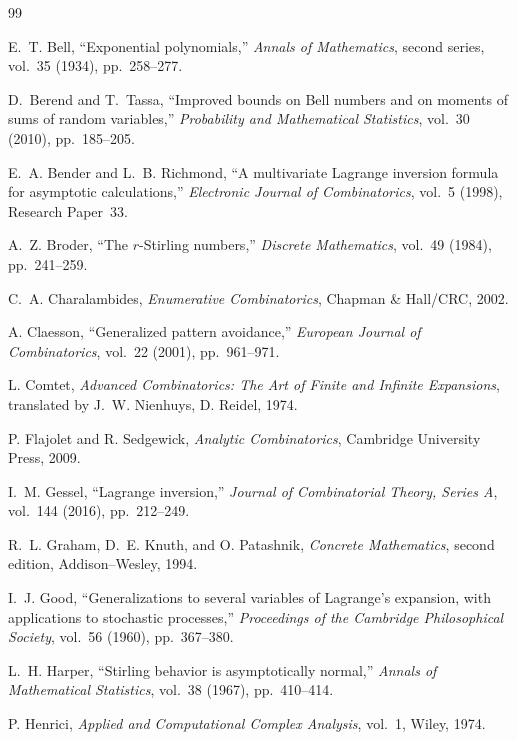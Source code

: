 \documentclass[11pt,a4paper,oneside,openany]{book}
\theoremstyle{definition}
\theoremstyle{remark}
\begin{document}
\begin{thebibliography}{99}

E.~T. Bell,
``Exponential polynomials,''
\emph{Annals of Mathematics}, second series, vol.~35 (1934), pp.~258--277.

D.~Berend and T.~Tassa,
``Improved bounds on Bell numbers and on moments of sums of random
variables,''
\emph{Probability and Mathematical Statistics}, vol.~30 (2010), pp.~185--205.

E.~A. Bender and L.~B. Richmond,
``A multivariate Lagrange inversion formula for asymptotic calculations,''
\emph{Electronic Journal of Combinatorics}, vol.~5 (1998), Research Paper~33.

A.~Z. Broder,
``The $r$-Stirling numbers,''
\emph{Discrete Mathematics}, vol.~49 (1984), pp.~241--259.

C.~A. Charalambides,
\emph{Enumerative Combinatorics},
Chapman \& Hall/CRC, 2002.

A. Claesson,
``Generalized pattern avoidance,''
\emph{European Journal of Combinatorics}, vol.~22 (2001), pp.~961--971.

L. Comtet,
\emph{Advanced Combinatorics: The Art of Finite and Infinite Expansions},
translated by J.~W. Nienhuys, D. Reidel, 1974.

P. Flajolet and R. Sedgewick,
\emph{Analytic Combinatorics},
Cambridge University Press, 2009.

I.~M. Gessel,
``Lagrange inversion,''
\emph{Journal of Combinatorial Theory, Series A}, vol.~144 (2016),
pp.~212--249.

R.~L. Graham, D.~E. Knuth, and O. Patashnik,
\emph{Concrete Mathematics}, second edition,
Addison--Wesley, 1994.

I.~J. Good,
``Generalizations to several variables of Lagrange's expansion, with applications
to stochastic processes,''
\emph{Proceedings of the Cambridge Philosophical Society}, vol.~56 (1960),
pp.~367--380.

L.~H. Harper,
``Stirling behavior is asymptotically normal,''
\emph{Annals of Mathematical Statistics}, vol.~38 (1967), pp.~410--414.

P. Henrici,
\emph{Applied and Computational Complex Analysis}, vol.~1,
Wiley, 1974.


\end{thebibliography}
\end{document}
